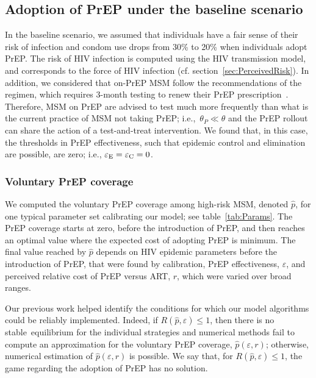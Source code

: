 \documentclass[11pt]{article}
\begin{document}
\subsection{Adoption of PrEP under the baseline scenario}

In the baseline scenario, we assumed that individuals have a fair sense of their risk of infection and condom use drops from 30\% to 20\% when individuals adopt PrEP.\cite{Molina2015} The risk of HIV infection is computed using the HIV transmission model, and corresponds to the force of HIV infection (cf. section~\ref{sec:PerceivedRisk}). 
In addition, we considered that on-PrEP MSM follow the recommendations of the regimen, which requires 3-month testing to renew their PrEP prescription~\cite{Molina2015}. Therefore, MSM on PrEP are advised to test much more frequently than what is the current practice of MSM not taking PrEP; i.e.,~$\theta_P \ll \theta$ and the PrEP rollout can share the action of a test-and-treat intervention. We found that, in this case, the thresholds in PrEP effectiveness, such that epidemic control and elimination are possible, are zero; i.e., $\varepsilon_{\rm E} = \varepsilon_{\rm C} = 0$.


\subsubsection{Voluntary PrEP coverage}

We computed the voluntary PrEP coverage among high-risk MSM, denoted $\hat{p}$, for one typical parameter set calibrating our model; see table~\ref{tab:Params}. The PrEP coverage starts at zero, before the introduction of PrEP, and then reaches an optimal value where the expected cost of adopting PrEP is minimum. The final value reached by $\hat{p}$ depends on HIV epidemic parameters before the introduction of PrEP, that were found by calibration, PrEP effectiveness, $\varepsilon$, and perceived relative cost of PrEP versus ART, $r$, which were varied over broad ranges. 

Our previous work \cite{Jijon2017} helped identify the conditions for which our model algorithms could be reliably implemented. Indeed, if $R(\hat{p},\varepsilon) \leq 1$, then there is no stable~equilibrium for the individual strategies and numerical methods fail to compute an approximation for the voluntary PrEP coverage, $\hat{p}(\varepsilon, r)$; otherwise, numerical estimation of $\hat{p}(\varepsilon, r)$ is possible. We say that, for $R(\hat{p},\varepsilon) \leq 1$, the game regarding the adoption of PrEP has no solution.
\end{document}
